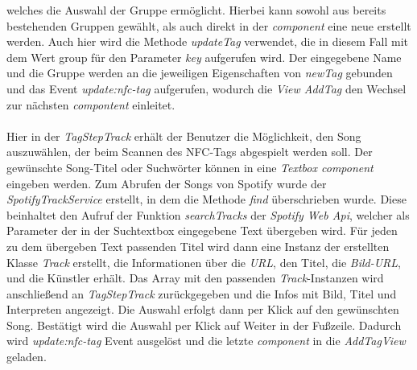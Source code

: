 \documentclass[10pt, a4paper]{article}
\begin{document}
\begin{onehalfspace}
welches die Auswahl der Gruppe ermöglicht. Hierbei kann sowohl aus bereits bestehenden Gruppen gewählt, als auch direkt in der \textit{component} eine neue erstellt
werden. Auch hier wird die Methode \textit{updateTag} verwendet, die in diesem Fall mit dem Wert \glqq group \grqq{} für den Parameter \textit{key} aufgerufen wird. Der eingegebene Name und die Gruppe werden an die jeweiligen Eigenschaften von \textit{newTag} gebunden und das Event \textit{update:nfc-tag} aufgerufen, wodurch die \textit{View AddTag} den Wechsel zur nächsten \textit{compontent} einleitet.
\\~\\
Hier in der \textit{TagStepTrack} erhält der Benutzer die Möglichkeit, den Song auszuwählen, der beim Scannen des NFC-Tags abgespielt werden soll.
Der gewünschte Song-Titel oder Suchwörter können in eine \textit{Textbox component} eingeben werden. Zum Abrufen der Songs von Spotify wurde der \textit{SpotifyTrackService} erstellt, in dem die Methode \textit{find} überschrieben wurde.
Diese beinhaltet den Aufruf der Funktion \textit{searchTracks} der \textit{Spotify Web Api}, welcher als Parameter der in der Suchtextbox eingegebene Text übergeben wird.
Für jeden zu dem übergeben Text passenden Titel wird dann eine Instanz der erstellten Klasse \textit{Track} erstellt, die Informationen über die \textit{URL}, den Titel, die \textit{Bild-URL}, und die Künstler erhält. Das Array mit den passenden \textit{Track}-Instanzen wird anschließend an \textit{TagStepTrack} zurückgegeben und die Infos mit Bild, Titel und Interpreten angezeigt. Die Auswahl erfolgt dann per Klick auf den gewünschten Song.
Bestätigt wird die Auswahl per Klick auf \glqq Weiter\grqq{} in der Fußzeile.
Dadurch wird \textit{update:nfc-tag} Event ausgelöst und die letzte \textit{component} in die \textit{AddTagView} geladen.

\end{onehalfspace}
\end{document}

